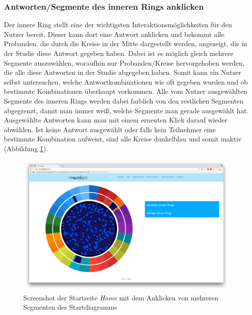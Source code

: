 \documentclass{mi-seminar}
\begin{document}
\subsubsection{Antworten/Segmente des inneren Rings anklicken}
Der innere Ring stellt eine der wichtigsten Interaktionsmöglichkeiten für den Nutzer bereit. Dieser kann dort eine Antwort anklicken und bekommt alle Probanden, die durch die Kreise in der Mitte dargestellt werden, angezeigt, die in der Studie diese Antwort gegeben haben. Dabei ist es möglich gleich mehrere Segmente auszuwählen, woraufhin nur  Probanden/Kreise hervorgehoben werden, die alle diese Antworten in der Studie abgegeben haben. Somit kann ein Nutzer selbst untersuchen, welche Antwortkombinationen wie oft gegeben wurden und ob bestimmte Kombinationen überhaupt vorkommen. Alle vom Nutzer ausgewählten Segmente des inneren Rings werden dabei farblich von den restlichen Segmenten abgegrenzt, damit man immer weiß, welche Segmente man gerade ausgewählt hat. Ausgewählte Antworten kann man mit einem erneuten Klick darauf wieder abwählen. Ist keine Antwort ausgewählt oder falls kein Teilnehmer eine bestimmte Kombination aufweist, sind alle Kreise dunkelblau und somit inaktiv (Abbildung \ref{ScStartDiagramInnerRingClick}).
\begin{figure}
\includegraphics[scale=0.3]{assets/start_click_inner_ring_segments.png}
\caption{Screenshot der Startseite \textit{Home} mit dem Anklicken von mehreren Segmenten des Startdiagramms}
\label{ScStartDiagramInnerRingClick}
\end{figure}
\end{document}
